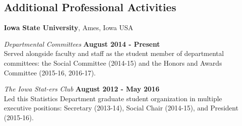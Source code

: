 \documentclass[margin,line]{res}
\begin{document}
\begin{resume}

\section{\sc Additional Professional Activities}

{\bf Iowa State University}, Ames, Iowa USA

\vspace{-.3cm}

{\em Departmental Committees} \hfill {\bf August 2014 - Present}\\
Served alongside faculty and staff as the student member of departmental committees: the Social Committee (2014-15) and the Honors and Awards Committee (2015-16, 2016-17). 

{\em The Iowa Stat-ers Club} \hfill {\bf August 2012 - May 2016}\\
Led this Statistics Department graduate student organization in multiple executive positions: Secretary (2013-14), Social Chair (2014-15), and President (2015-16).




\end{resume}
\end{document}
